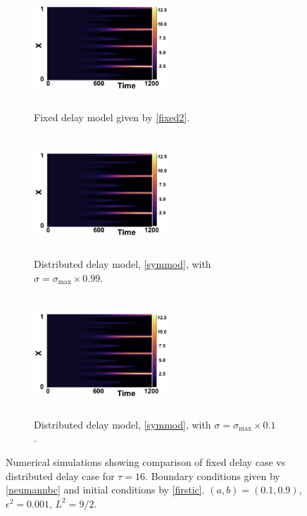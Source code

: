 \begin{figure}[H]
    \centering
    \begin{subfigure}[t]{0.32\textwidth}
        \centering
        \includegraphics[width=5cm,height=4.5cm]{distt16sig10.png}
        \caption{Fixed delay model given by \eqref{fixed2}.}
        \label{}
    \end{subfigure}
    \hfill
    \begin{subfigure}[t]{0.32\textwidth}
        \centering
        \includegraphics[width=5cm,height=4.5cm]{distt16sig10.png}
        \caption{Distributed delay model, \eqref{symmod}, with $\sigma=\sigma_{\max}\times0.99$.}
        \label{}
    \end{subfigure}
    \hfill
    \begin{subfigure}[t]{0.32\textwidth}
        \centering
        \includegraphics[width=5cm,height=4.5cm]{distt16sigmax.png}
        \caption{Distributed delay model, \eqref{symmod}, with $\sigma=\sigma_{\max}\times0.1$.}
        \label{}
    \end{subfigure}
    \caption{Numerical simulations showing comparison of fixed delay case vs distributed delay case for $\tau=16$. Boundary conditions given by \eqref{neumannbc} and initial conditions by \eqref{firstic}. $(a,b)=(0.1,0.9)$, $\epsilon^2=0.001$, $L^2=9/2$.}
    \label{fig:distres2}
\end{figure}
